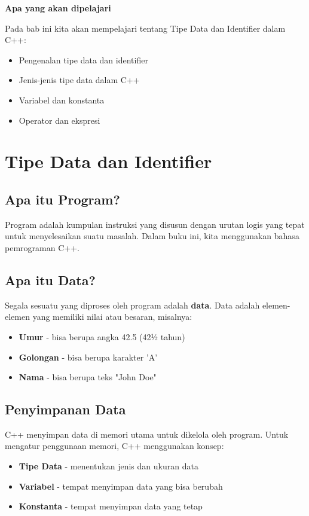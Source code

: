 \textbf{Apa yang akan dipelajari}

Pada bab ini kita akan mempelajari tentang Tipe Data dan Identifier dalam C++:

\begin{itemize}
\item Pengenalan tipe data dan identifier
\item Jenis-jenis tipe data dalam C++
\item Variabel dan konstanta
\item Operator dan ekspresi
\end{itemize}

\minitoc

\section{Tipe Data dan Identifier}\label{tipe-data-dan-identifier}

\subsection{Apa itu Program?}

Program adalah kumpulan instruksi yang disusun dengan urutan logis yang tepat untuk menyelesaikan suatu masalah. Dalam buku ini, kita menggunakan bahasa pemrograman C++.

\subsection{Apa itu Data?}

Segala sesuatu yang diproses oleh program adalah \textbf{data}. Data adalah elemen-elemen yang memiliki nilai atau besaran, misalnya:
\begin{itemize}
\item \textbf{Umur} - bisa berupa angka 42.5 (42½ tahun)
\item \textbf{Golongan} - bisa berupa karakter 'A'
\item \textbf{Nama} - bisa berupa teks "John Doe"
\end{itemize}

\subsection{Penyimpanan Data}

C++ menyimpan data di memori utama untuk dikelola oleh program. Untuk mengatur penggunaan memori, C++ menggunakan konsep:
\begin{itemize}
\item \textbf{Tipe Data} - menentukan jenis dan ukuran data
\item \textbf{Variabel} - tempat menyimpan data yang bisa berubah
\item \textbf{Konstanta} - tempat menyimpan data yang tetap
\end{itemize}

